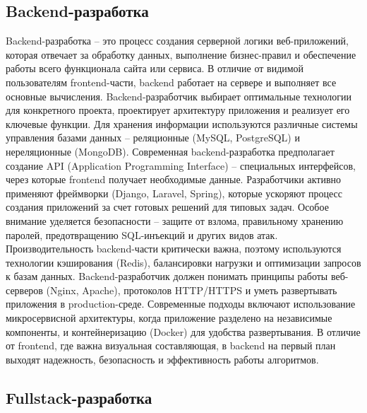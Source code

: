 \documentclass[referat]{SCWorks}
\begin{document}
\subsection{Backend-разработка}

Backend-разработка -- это процесс создания серверной логики веб-приложений, которая отвечает за обработку данных, выполнение бизнес-правил и обеспечение работы всего функционала сайта или сервиса. В отличие от видимой пользователям frontend-части, backend работает на сервере и выполняет все основные вычисления. Backend-разработчик выбирает оптимальные технологии для конкретного проекта, проектирует архитектуру приложения и реализует его ключевые функции. Для хранения информации используются различные системы управления базами данных -- реляционные (MySQL, PostgreSQL) и нереляционные (MongoDB). Современная backend-разработка предполагает создание API (Application Programming Interface) -- специальных интерфейсов, через которые frontend получает необходимые данные. Разработчики активно применяют фреймворки (Django, Laravel, Spring), которые ускоряют процесс создания приложений за счет готовых решений для типовых задач. Особое внимание уделяется безопасности -- защите от взлома, правильному хранению паролей, предотвращению SQL-инъекций и других видов атак. Производительность backend-части критически важна, поэтому используются технологии кэширования (Redis), балансировки нагрузки и оптимизации запросов к базам данных. Backend-разработчик должен понимать принципы работы веб-серверов (Nginx, Apache), протоколов HTTP/HTTPS и уметь развертывать приложения в production-среде. Современные подходы включают использование микросервисной архитектуры, когда приложение разделено на независимые компоненты, и контейнеризацию (Docker) для удобства развертывания. В отличие от frontend, где важна визуальная составляющая, в backend на первый план выходят надежность, безопасность и эффективность работы алгоритмов.\cite{backend_web_development}

\subsection{Fullstack-разработка}
\end{document}
